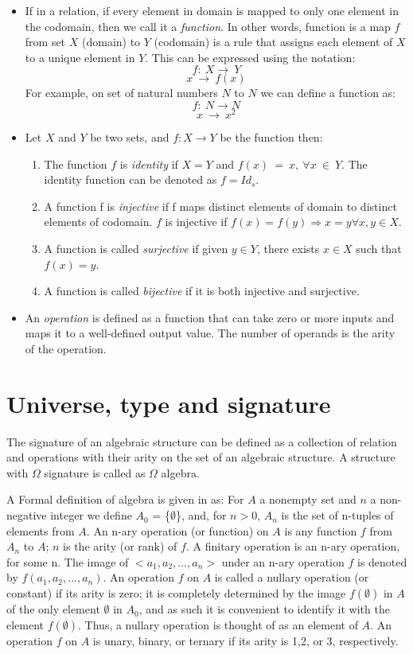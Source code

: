 \begin{itemize}
\item If in a relation, if every element in domain is mapped to only one element in
the codomain, then we call it a \emph{function}. In other words, function is a
map $f$ from set $X$ (domain) to $Y$ (codomain) is a rule that assigns each
element of $X$ to a unique element in $Y$. This can be expressed using the notation:
\[f:\ X \rightarrow\ Y\]
\[x \ \rightarrow\ f(x)\]
For example, on set of natural numbers $N$ to $N$ we can define a function as:
\[f:\ N \rightarrow N\]
\[x \ \rightarrow\ x^{2}\]   
\item Let $ X $ and $ Y $ be two sets, and $ f:X \rightarrow Y$ be the function then:
\begin{enumerate}
    \item The function $f$ is \textit{identity} if $X=Y$ and $f(x)\ =\ x,\ \forall x\ \in
    \ Y$. The identity function can be denoted as $f=Id_s$.
    \item A function f is \emph{injective} if f maps distinct elements of domain to
    distinct elements of codomain. $f$ is injective if $f(x)=f(y) \Rightarrow x = y \forall x,y \in X.$
    \item A function is called \emph{surjective} if given $y \in Y$, there
    exists $x\in X$ such that $f(x) = y$.
    \item A function is called \emph{bijective} if it is both injective and surjective.
\end{enumerate}
\item An \emph{operation} is defined as a function that can take zero or more inputs
and maps it to a well-defined output value. The number of operands is the arity
of the operation.
\end{itemize}

\section{Universe, type and signature}
The signature of an algebraic structure can be defined as a collection of
relation and operations with their arity on the set of an algebraic structure. A
structure with \(\Omega\) signature is called as \(\Omega\) algebra.

A Formal definition of algebra is given in \cite{sankappanavar1981course} as:
For $A$ a nonempty set and $n$ a non-negative integer we define $A_0$ =
\{\(\emptyset\)\}, and, for $n > 0$, $A_n$ is the set of n-tuples of elements
from $A$. An n-ary operation (or function) on $A$ is any function $f$ from $A_n$
to $A$; $n$ is the arity (or rank) of $f$. A finitary operation is an n-ary
operation, for some n. The image of $<a_1,a_2,...,a_n>$ under an n-ary operation
$f$ is denoted by $f(a_1,a_2,...,a_n)$. An operation $f$ on $A$ is called a
nullary operation (or constant) if its arity is zero; it is completely
determined by the image $f(\emptyset)$ in $A$ of the only element \(\emptyset\)
in $A_0$, and as such it is convenient to identify it with the element
$f(\emptyset)$. Thus, a nullary operation is thought of as an element of $A$. An
operation $f$ on $A$ is unary, binary, or ternary if its arity is 1,2, or 3,
respectively.

